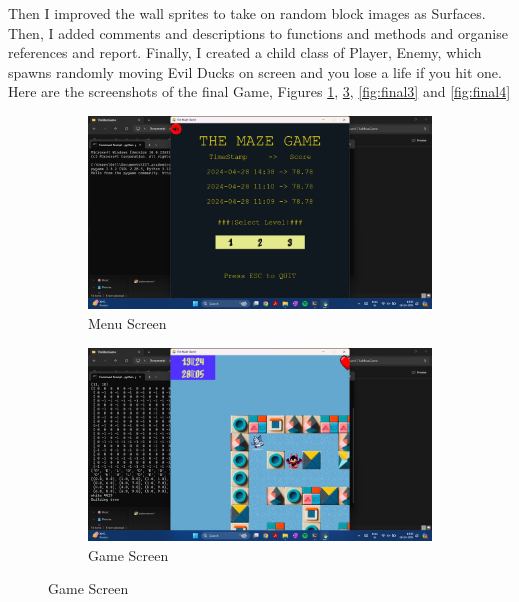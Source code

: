 \documentclass{article}
\begin{document}
\noindent Then I improved the wall sprites to take on random block images as Surfaces. Then, I added comments and descriptions to functions and methods and organise references and report. Finally, I created a child class of Player, Enemy, which spawns randomly moving Evil Ducks on screen and you lose a life if you hit one. Here are the screenshots of the final Game, Figures \ref{fig:final1}, \ref{fig:final2}, \ref{fig:final3} and \ref{fig:final4}

\begin{figure}[h]
    \caption[1]{}
    \begin{subfigure}[b]{0.5\textwidth}
        \centering
        \includegraphics[width=\textwidth]{screenshots/Screenshot (181).png}
        \caption[(a)]{Menu Screen}
        \label{fig:final1}
    \end{subfigure}
    \begin{subfigure}[b]{0.5\textwidth}
        \centering
        \includegraphics[width=\textwidth]{screenshots/Screenshot (182).png}
        \caption[(a)]{Game Screen}
        \label{fig:final2}
    \end{subfigure}

\end{figure}
\end{document}
